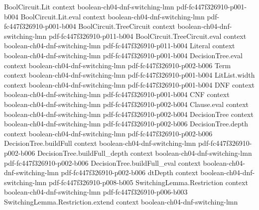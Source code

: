 \begin{lemma}
\label{LMN.and_children_have_cnf}
\leanok
{}
\proofstep
  {BoolCircuit.Lit}
  {context}
  {boolean-ch04-dnf-switching-lmn}
  {pdf-fc447f326910-p001-b004}
\proofstep
  {BoolCircuit.Lit.eval}
  {context}
  {boolean-ch04-dnf-switching-lmn}
  {pdf-fc447f326910-p001-b004}
\proofstep
  {BoolCircuit.TreeCircuit}
  {context}
  {boolean-ch04-dnf-switching-lmn}
  {pdf-fc447f326910-p011-b004}
\proofstep
  {BoolCircuit.TreeCircuit.eval}
  {context}
  {boolean-ch04-dnf-switching-lmn}
  {pdf-fc447f326910-p011-b004}
\proofstep
  {Literal}
  {context}
  {boolean-ch04-dnf-switching-lmn}
  {pdf-fc447f326910-p001-b004}
\proofstep
  {DecisionTree.eval}
  {context}
  {boolean-ch04-dnf-switching-lmn}
  {pdf-fc447f326910-p002-b006}
\proofstep
  {Term}
  {context}
  {boolean-ch04-dnf-switching-lmn}
  {pdf-fc447f326910-p001-b004}
\proofstep
  {LitList.width}
  {context}
  {boolean-ch04-dnf-switching-lmn}
  {pdf-fc447f326910-p001-b004}
\proofstep
  {DNF}
  {context}
  {boolean-ch04-dnf-switching-lmn}
  {pdf-fc447f326910-p001-b004}
\proofstep
  {CNF}
  {context}
  {boolean-ch04-dnf-switching-lmn}
  {pdf-fc447f326910-p002-b004}
\proofstep
  {Clause.eval}
  {context}
  {boolean-ch04-dnf-switching-lmn}
  {pdf-fc447f326910-p002-b004}
\proofstep
  {DecisionTree}
  {context}
  {boolean-ch04-dnf-switching-lmn}
  {pdf-fc447f326910-p002-b006}
\proofstep
  {DecisionTree.depth}
  {context}
  {boolean-ch04-dnf-switching-lmn}
  {pdf-fc447f326910-p002-b006}
\proofstep
  {DecisionTree.buildFull}
  {context}
  {boolean-ch04-dnf-switching-lmn}
  {pdf-fc447f326910-p002-b006}
\proofstep
  {DecisionTree.buildFull_depth}
  {context}
  {boolean-ch04-dnf-switching-lmn}
  {pdf-fc447f326910-p002-b006}
\proofstep
  {DecisionTree.buildFull_eval}
  {context}
  {boolean-ch04-dnf-switching-lmn}
  {pdf-fc447f326910-p002-b006}
\proofstep
  {dtDepth}
  {context}
  {boolean-ch04-dnf-switching-lmn}
  {pdf-fc447f326910-p008-b005}
\proofstep
  {SwitchingLemma.Restriction}
  {context}
  {boolean-ch04-dnf-switching-lmn}
  {pdf-fc447f326910-p006-b003}
\proofstep
  {SwitchingLemma.Restriction.extend}
  {context}
  {boolean-ch04-dnf-switching-lmn}

\end{lemma}
